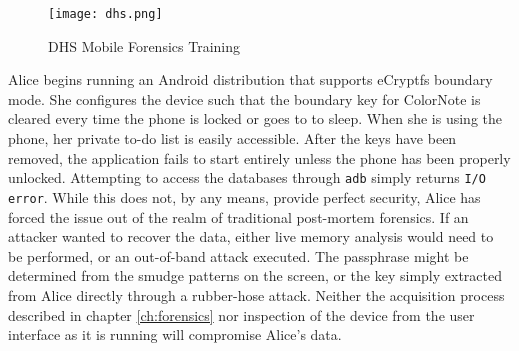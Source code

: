\begin{figure}[!htb]
\begin{center}
\texttt{[image: dhs.png]}
\end{center}
\caption{DHS Mobile Forensics Training} 
\label{fig:dhs}
\end{figure}

Alice begins running an Android distribution that supports eCryptfs boundary mode. She configures the device such that the boundary
key for ColorNote is cleared every time the phone is locked or goes to to sleep. When she is using the phone, her private to-do list
is easily accessible. After the keys have been removed, the application fails to start entirely unless the phone has been properly
unlocked. Attempting to access the databases through \texttt{adb} simply returns \texttt{I/O error}. While this does not, by any
means, provide perfect security, Alice has forced the issue out of the realm of traditional post-mortem forensics. If an attacker
wanted to recover the data, either live memory analysis would need to be performed, or an out-of-band attack executed. The
passphrase might be determined from the smudge patterns on the screen, or the key simply extracted from Alice directly through a
rubber-hose attack. Neither the acquisition process described in chapter \ref{ch:forensics} nor inspection of the device from the
user interface as it is running will compromise Alice's data.
